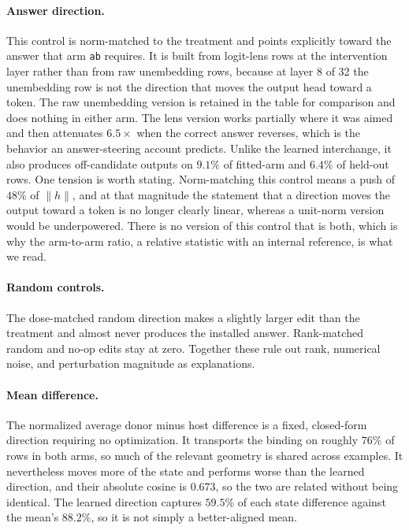\documentclass{article}
\begin{document}
\paragraph{Answer direction.}
This control is norm-matched to the treatment and points explicitly toward the answer that arm \texttt{ab} requires. It is built from logit-lens rows at the intervention layer rather than from raw unembedding rows, because at layer 8 of 32 the unembedding row is not the direction that moves the output head toward a token. The raw unembedding version is retained in the table for comparison and does nothing in either arm. The lens version works partially where it was aimed and then attenuates $6.5\times$ when the correct answer reverses, which is the behavior an answer-steering account predicts. Unlike the learned interchange, it also produces off-candidate outputs on $9.1\%$ of fitted-arm and $6.4\%$ of held-out rows. One tension is worth stating. Norm-matching this control means a push of $48\%$ of $\|h\|$, and at that magnitude the statement that a direction moves the output toward a token is no longer clearly linear, whereas a unit-norm version would be underpowered. There is no version of this control that is both, which is why the arm-to-arm ratio, a relative statistic with an internal reference, is what we read.

\paragraph{Random controls.}
The dose-matched random direction makes a slightly larger edit than the treatment and almost never produces the installed answer. Rank-matched random and no-op edits stay at zero. Together these rule out rank, numerical noise, and perturbation magnitude as explanations.

\paragraph{Mean difference.}
The normalized average donor minus host difference is a fixed, closed-form direction requiring no optimization. It transports the binding on roughly $76\%$ of rows in both arms, so much of the relevant geometry is shared across examples. It nevertheless moves more of the state and performs worse than the learned direction, and their absolute cosine is $0.673$, so the two are related without being identical. The learned direction captures $59.5\%$ of each state difference against the mean's $88.2\%$, so it is not simply a better-aligned mean.
\end{document}
